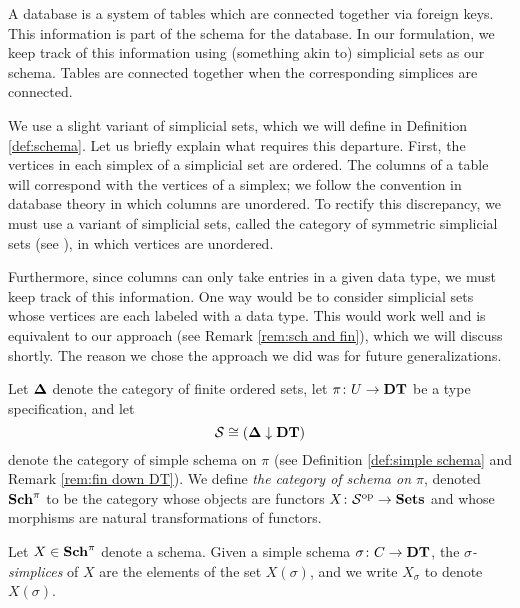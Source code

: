 \documentclass{amsart}
\begin{document}
A database is a system of tables which are connected together via foreign keys.  This information is part of the schema for the database.  In our formulation, we keep track of this information using (something akin to) simplicial sets as our schema.  Tables are connected together when the corresponding simplices are connected.  

We use a slight variant of simplicial sets, which we will define in Definition \ref{def:schema}.  Let us briefly explain what requires this departure.  First, the vertices in each simplex of a simplicial set are ordered.  The columns of a table will correspond with the vertices of a simplex; we follow the convention in database theory in which columns are unordered.  To rectify this discrepancy, we must use a variant of simplicial sets, called the category of symmetric simplicial sets (see \cite{Gra}), in which vertices are unordered.

Furthermore, since columns can only take entries in a given data type, we must keep track of this information.  One way would be to consider simplicial sets whose vertices are each labeled with a data type.  This would work well and is equivalent to our approach (see Remark \ref{rem:sch and fin}), which we will discuss shortly.  The reason we chose the approach we did was for future generalizations.

\begin{definition}\label{def:schema}

Let ${\bf \Delta}$ denote the category of finite ordered sets, let $\pi\colon U\rightarrow{\bf DT}$ be a type specification, and let $$\mathcal{S}\cong({\bf \Delta}\downarrow{\bf DT})$$ denote the category of simple schema on $\pi$ (see Definition \ref{def:simple schema} and Remark \ref{rem:fin down DT}).  We define {\em the category of schema on $\pi$}, denoted ${\bf Sch}^\pi$ to be the category whose objects are functors $X\colon\mathcal{S}^\textnormal{op}\rightarrow{\bf Sets}$ and whose morphisms are natural transformations of functors.

Let $X\in{\bf Sch}^\pi$ denote a schema.  Given a simple schema $\sigma\colon C\rightarrow{\bf DT}$, the {\em $\sigma$-simplices} of $X$ are the elements of the set $X(\sigma)$, and we write $X_\sigma$ to denote $X(\sigma)$.

\end{definition}
\end{document}
